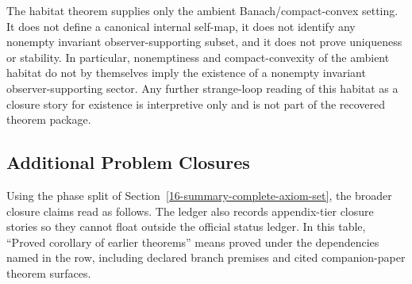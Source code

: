 The habitat theorem supplies only the ambient Banach/compact-convex setting. It does not define a
canonical internal self-map, it does not identify any nonempty invariant observer-supporting subset,
and it does not prove uniqueness or stability. In particular, nonemptiness and compact-convexity
of the ambient habitat do not by themselves imply the existence of a nonempty invariant
observer-supporting sector. Any further strange-loop reading of this habitat as a closure story
for existence is interpretive only and is not part of the recovered theorem package.

\subsection{Additional Problem Closures}

Using the phase split of Section~\ref{16-summary-complete-axiom-set}, the broader closure claims
read as follows. The ledger also records appendix-tier closure stories so they cannot float
outside the official status ledger. In this table, ``Proved corollary of earlier theorems'' means
proved under the dependencies named in the row, including declared branch premises and cited
companion-paper theorem surfaces.


